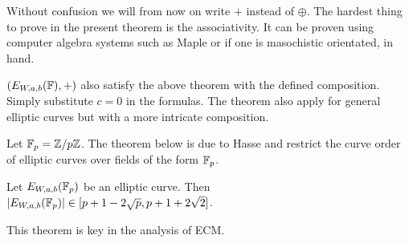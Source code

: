 Without confusion we will from now on write $+$ instead of $\oplus$. The hardest thing to prove in the present theorem is the associativity. It can be proven using computer algebra systems such as Maple or if one is masochistic orientated, in hand.  
\begin{rem}\label{rem:groupShortW}
$(E_{W,a,b}(\mathbb{F}),+)$ also satisfy the above theorem with the defined composition. Simply substitute $c=0$ in the formulas. The theorem also apply for general elliptic curves but with a more intricate composition.
\end{rem}
Let $\mathbb{F}_p=\mathbb{Z}/p\mathbb{Z}$. The theorem below is due to Hasse and restrict the curve order of elliptic curves over fields of the form $\mathbb{F}_p$. 
\begin{thm}\label{thm:hasse}
Let $E_{W,a,b}(\mathbb{F}_p)$ be an elliptic curve. Then $\vert E_{W,a,b}(\mathbb{F}_p)\vert \in [p+1-2\sqrt{p},p+1+2\sqrt{2}]$. 
\end{thm}
This theorem is key in the analysis of ECM.
